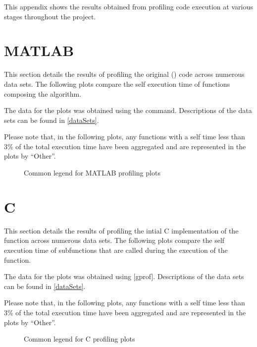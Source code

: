 This appendix shows the results obtained from profiling code execution at
various stages throughout the project.

\section{MATLAB}
\label{profiling:matlab}
This section details the results of profiling the original ()
code across numerous data sets. The following plots compare the self execution
time of functions composing the  algorithm.

The data for the plots was obtained using the 
 command. Descriptions of the data sets can be found in
\autoref{dataSets}.

Please note that, in the following plots, any functions with a self time less
than 3\% of the total execution time have been aggregated and are represented in
the plots by ``Other''.

\begin{figure}
    
    \caption{Common legend for MATLAB profiling plots}
    \label{profiling:matlab:legend}
\end{figure}



\section{C}
\label{profiling:c}
This section details the results of profiling the intial C implementation of the
 function across numerous data sets. The
following plots compare the self execution time of subfunctions that are called
during the execution of the  function.

The data for the plots was obtained using [gprof].
Descriptions of the data sets can be found in \autoref{dataSets}.

Please note that, in the following plots, any functions with a self time less
than 3\% of the total execution time have been aggregated and are represented in
the plots by ``Other''.

\begin{figure}
    
    \caption{Common legend for C profiling plots}
    \label{profiling:c:legend}
\end{figure}

